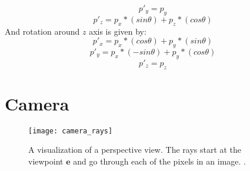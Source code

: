 \documentclass[11pt,a4paper]{article}
\begin{document}
	\begin{equation}
		p'_{y} = p_{y}
	\end{equation}
	\begin{equation}
		p'_{z} = p_{x}*(sin\theta) + p_{z}*(cos\theta)
	\end{equation}
	And rotation around $z$ axis is given by:
	\begin{equation}
		p'_{x} = p_{x}*(cos\theta) + p_{y}*(sin\theta)
	\end{equation}
	\begin{equation}
		p'_{y} = p_{x}*(-sin\theta) + p_{y}*(cos\theta)
	\end{equation}
	\begin{equation}
		p'_{z} = p_{z}
	\end{equation}
	
	\pagebreak
	\section{Camera}
	
	\begin{wrapfigure}{r}{0.5\textwidth}
		\centering
		\texttt{[image: camera\_rays]} 
		\caption{A visualization of a perspective view. The rays start at the viewpoint $\boldsymbol{e}$ and go through each of the pixels in an image. \protect\cite{marschner2018fundamentals}.}
		\label{fig:wrapfig2}
	\end{wrapfigure}
	
\end{document}
